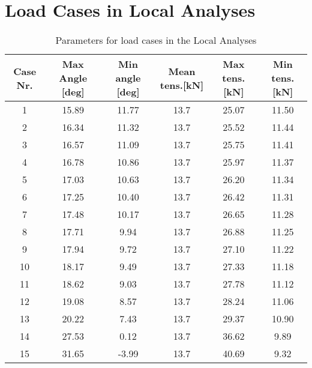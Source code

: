 \chapter{Load Cases in Local Analyses}
\label{appendix:C}

\begin{table} [H]
\centering
\begin{tabular}{ |c|c|c|c|c|c|}
\hline
	Case Nr. & Max Angle [deg] & Min angle [deg] & Mean tens.[kN] & Max tens.[kN]  & Min tens.[kN]   \\
 \hline
 \hline
	1 & 15.89 & 11.77 & 13.7 & 25.07 & 11.50   \\ 
	2 &  16.34 & 11.32 & 13.7 & 25.52 & 11.44   \\
	3 &  16.57 & 11.09 & 13.7 & 25.75 & 11.41   \\ 
	4 &  16.78 & 10.86 & 13.7 & 25.97 & 11.37  \\ 
	5 &  17.03 & 10.63 & 13.7 & 26.20 & 11.34  \\ 
	6 &  17.25 & 10.40 & 13.7 & 26.42 & 11.31  \\ 
	7 &  17.48 & 10.17 & 13.7 & 26.65 & 11.28   \\ 
	8 &  17.71 & 9.94 & 13.7 & 26.88 & 11.25  \\ 
	9 &  17.94 & 9.72 & 13.7 & 27.10 & 11.22  \\ 
	10 &  18.17 & 9.49 & 13.7 & 27.33 & 11.18  \\ 
	11 & 18.62 & 9.03 & 13.7 & 27.78 & 11.12  \\ 
	12 &  19.08 & 8.57 & 13.7 & 28.24 & 11.06  \\ 
	13 &  20.22 & 7.43 & 13.7 & 29.37 & 10.90  \\ 
	14 &  27.53 & 0.12 & 13.7 & 36.62 & 9.89  \\ 
	15 &  31.65 & -3.99 & 13.7 & 40.69 & 9.32 \\ 
 \hline
\end{tabular}
\caption{Parameters for load cases in the Local Analyses}
\label{table:loadcase}
\end{table} 